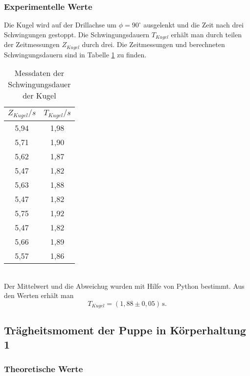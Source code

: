 \subsubsection{Experimentelle Werte}
Die Kugel wird auf der Drillachse um $\phi = 90^{\circ}$ ausgelenkt und die Zeit nach drei
Schwingungen gestoppt. Die Schwingungsdauern $T_{Kugel}$ erhält man durch teilen der Zeitmessungen
$Z_{Kugel}$ durch drei. Die Zeitmessungen und berechneten Schwingungsdauern sind in
Tabelle \ref{tab:T_Kugel} zu finden.
\begin{table}
  \centering
  \caption{Messdaten der Schwingungsdauer der Kugel}
  \label{tab:T_Kugel}
  \begin{tabular}{c c}
    \toprule
    $Z_{Kugel}/s$ & $T_{Kugel}/s$ \\
    \midrule
    5,94 & 1,98 \\
    5,71 & 1,90 \\
    5,62 & 1,87 \\
    5,47 & 1,82 \\
    5,63 & 1,88 \\
    5,47 & 1,82 \\
    5,75 & 1,92 \\
    5,47 & 1,82 \\
    5,66 & 1,89 \\
    5,57 & 1,86 \\
    \bottomrule
  \end{tabular}
\end{table}
\\
Der Mittelwert und die Abweichug wurden mit Hilfe von Python bestimmt. Aus den Werten erhält man
\begin{equation}
  T_{Kugel} = (1{,}88 \pm 0{,}05)\, \mathrm{s} .
\end{equation}

\subsection{Trägheitsmoment der Puppe in Körperhaltung 1}
\subsubsection{Theoretische Werte}

